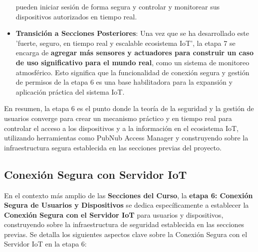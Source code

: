 \documentclass{report}
\begin{document}
\begin{itemize}
    pueden iniciar sesión de forma segura y controlar y monitorear sus dispositivos autorizados en tiempo real.
    \item \textbf{Transición a Secciones Posteriores}: Una vez que se ha desarrollado este  'fuerte, seguro, en tiempo real y escalable ecosistema IoT', 
    la etapa 7 se encarga de \textbf{agregar más sensores y actuadores para construir un caso de uso significativo para el mundo real}, como un 
    sistema de monitoreo atmosférico. Esto significa que la funcionalidad de conexión segura y gestión de permisos de la etapa 6 es una base 
    habilitadora para la expansión y aplicación práctica del sistema IoT.
\end{itemize}
En resumen, la etapa 6 es el punto donde la teoría de la seguridad y la gestión de usuarios converge para crear un mecanismo práctico y en tiempo 
real para controlar el acceso a los dispositivos y a la información en el ecosistema IoT, utilizando herramientas como PubNub Access Manager y 
construyendo sobre la infraestructura segura establecida en las secciones previas del proyecto.

\subsection{Conexión Segura con Servidor IoT}
En el contexto más amplio de las \textbf{Secciones del Curso}, la \textbf{etapa 6: Conexión Segura de Usuarios y Dispositivos} se dedica específicamente 
a establecer la \textbf{Conexión Segura con el Servidor IoT} para usuarios y dispositivos, construyendo sobre la infraestructura de seguridad establecida 
en las secciones previas. Se detalla los siguientes aspectos clave sobre la Conexión Segura con el Servidor IoT en la etapa 6:
\end{document}
